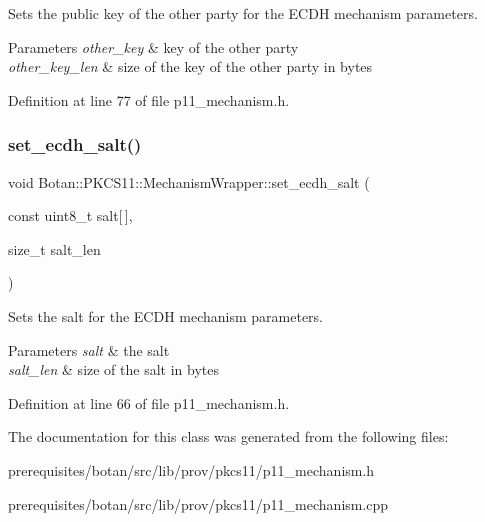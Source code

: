 Sets the public key of the other party for the E\+C\+DH mechanism parameters. 
\begin{DoxyParams}{Parameters}
{\em other\+\_\+key} & key of the other party \\
\hline
{\em other\+\_\+key\+\_\+len} & size of the key of the other party in bytes \\
\hline
\end{DoxyParams}


Definition at line 77 of file p11\+\_\+mechanism.\+h.

\mbox{\label{class_botan_1_1_p_k_c_s11_1_1_mechanism_wrapper_a09212081c178d1d572da012514e8959b}} 
\subsubsection{\texorpdfstring{set\+\_\+ecdh\+\_\+salt()}{set\_ecdh\_salt()}}
{\footnotesize\ttfamily void Botan\+::\+P\+K\+C\+S11\+::\+Mechanism\+Wrapper\+::set\+\_\+ecdh\+\_\+salt (\begin{DoxyParamCaption}\item[{const uint8\+\_\+t}]{salt\mbox{[}$\,$\mbox{]},  }\item[{size\+\_\+t}]{salt\+\_\+len }\end{DoxyParamCaption})\hspace{0.3cm}{\ttfamily [inline]}}

Sets the salt for the E\+C\+DH mechanism parameters. 
\begin{DoxyParams}{Parameters}
{\em salt} & the salt \\
\hline
{\em salt\+\_\+len} & size of the salt in bytes \\
\hline
\end{DoxyParams}


Definition at line 66 of file p11\+\_\+mechanism.\+h.



The documentation for this class was generated from the following files\+:\begin{DoxyCompactItemize}
\item 
prerequisites/botan/src/lib/prov/pkcs11/p11\+\_\+mechanism.\+h\item 
prerequisites/botan/src/lib/prov/pkcs11/p11\+\_\+mechanism.\+cpp\end{DoxyCompactItemize}
